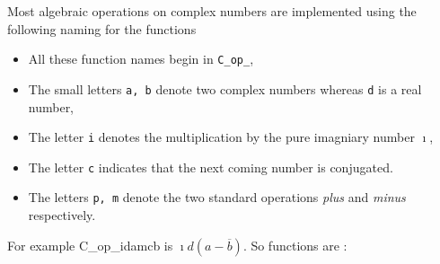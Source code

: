 Most algebraic operations on complex numbers are implemented using the
following naming for the functions
\begin{itemize}
\item All these function names begin in {\tt C_op_}, 
\item The small letters {\tt a, b} denote two complex numbers whereas {\tt d} is a real number, 
\item The letter {\tt i} denotes the multiplication by the pure imagniary
  number $\imath$, 
\item The letter {\tt c} indicates that the next coming number is conjugated.
\item The letters {\tt p, m} denote the two standard operations {\it plus} and
  {\it minus} respectively.
\end{itemize}
For example C_op_idamcb is $\imath d \left( a - \overline{b} \right)$. So
functions are :
